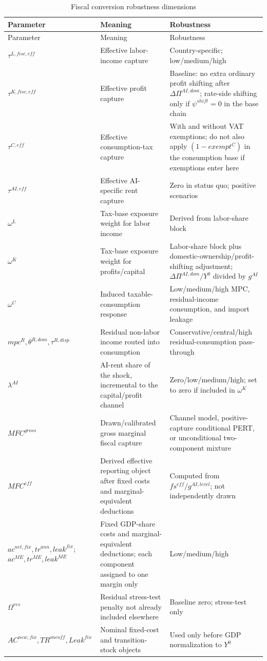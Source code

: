 \documentclass[11pt,a4paper]{article}
\begin{document}
\begin{longtable}{>{\raggedright\arraybackslash}p{}>{\raggedright\arraybackslash}p{}>{\raggedright\arraybackslash}p{}}
\caption{Fiscal conversion robustness dimensions}\label{tab:fiscal_conversion_robustness}\\
\toprule
Parameter & Meaning & Robustness \\
\midrule
\endfirsthead
\toprule
Parameter & Meaning & Robustness \\
\midrule
\endhead
$\tau^{L,fisc,eff}$ & Effective labor-income capture & Country-specific; low/medium/high \\
$\tau^{K,fisc,eff}$ & Effective profit capture & Baseline: no extra ordinary profit shifting after $\Delta\Pi^{AI,dom}$; rate-side shifting only if $\psi^{shift}=0$ in the base chain \\
$\tau^{C,eff}$ & Effective consumption-tax capture & With and without VAT exemptions; do not also apply $(1-exempt^C)$ in the consumption base if exemptions enter here \\
$\tau^{AI,eff}$ & Effective AI-specific rent capture & Zero in status quo; positive scenarios \\
$\omega^L$ & Tax-base exposure weight for labor income & Derived from labor-share block \\
$\omega^K$ & Tax-base exposure weight for profits/capital & Labor-share block plus domestic-ownership/profit-shifting adjustment; $\Delta\Pi^{AI,dom}/Y^0$ divided by $g^{AI}$ \\
$\omega^C$ & Induced taxable-consumption response & Low/medium/high MPC, residual-income consumption, and import leakage \\
$mpc^R,\theta^{R,dom},\tau^{R,disp}$ & Residual non-labor income routed into consumption & Conservative/central/high residual-consumption pass-through \\
$\lambda^{AI}$ & AI-rent share of the shock, incremental to the capital/profit channel & Zero/low/medium/high; set to zero if included in $\omega^K$ \\
$MFC^{gross}$ & Drawn/calibrated gross marginal fiscal capture & Channel model, positive-capture conditional PERT, or unconditional two-component mixture \\
$MFC^{eff}$ & Derived effective reporting object after fixed costs and marginal-equivalent deductions & Computed from $fs^{eff}/g^{AI,level}$; not independently drawn \\
$ac^{net,fix},tr^{ann},leak^{fix}$; $ac^{ME},tr^{ME},leak^{ME}$ & Fixed GDP-share costs and marginal-equivalent deductions; each component assigned to one margin only & Low/medium/high \\
$\Omega^{res}$ & Residual stress-test penalty not already included elsewhere & Baseline zero; stress-test only \\
$AC^{new,fix},TR^{oneoff},Leak^{fix}$ & Nominal fixed-cost and transition-stock objects & Used only before GDP normalization to $Y^0$ \\
\bottomrule
\end{longtable}
\end{document}
